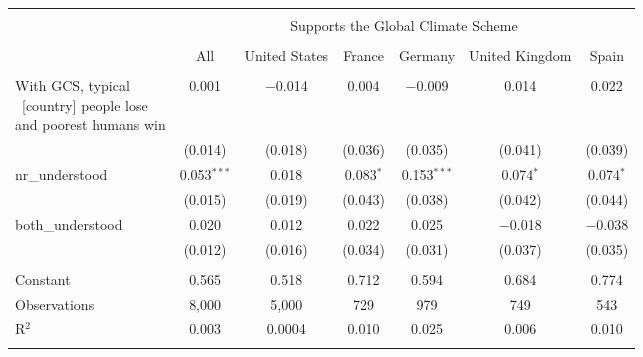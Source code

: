 
\begin{tabular}{@{\extracolsep{5pt}}lcccccc} 
\\[-1.8ex]\hline 
\hline \\[-1.8ex] 
 & \multicolumn{6}{c}{Supports the Global Climate Scheme} \\ 
\cline{2-7} 
\\[-1.8ex] & All & United States & France & Germany & United Kingdom & Spain \\ 
\hline \\[-1.8ex] 
 \makecell{With GCS, typical\\~[country] people lose\\and poorest humans win} & 0.001 & $-$0.014 & 0.004 & $-$0.009 & 0.014 & 0.022 \\ 
  & (0.014) & (0.018) & (0.036) & (0.035) & (0.041) & (0.039) \\ 
  nr\_understood & 0.053$^{***}$ & 0.018 & 0.083$^{*}$ & 0.153$^{***}$ & 0.074$^{*}$ & 0.074$^{*}$ \\ 
  & (0.015) & (0.019) & (0.043) & (0.038) & (0.042) & (0.044) \\ 
  both\_understood & 0.020 & 0.012 & 0.022 & 0.025 & $-$0.018 & $-$0.038 \\ 
  & (0.012) & (0.016) & (0.034) & (0.031) & (0.037) & (0.035) \\ 
 \hline \\[-1.8ex] 
Constant & 0.565 & 0.518 & 0.712 & 0.594 & 0.684 & 0.774 \\ 
Observations & 8,000 & 5,000 & 729 & 979 & 749 & 543 \\ 
R$^{2}$ & 0.003 & 0.0004 & 0.010 & 0.025 & 0.006 & 0.010 \\ 
\hline 
\hline \\[-1.8ex] 
\end{tabular} 